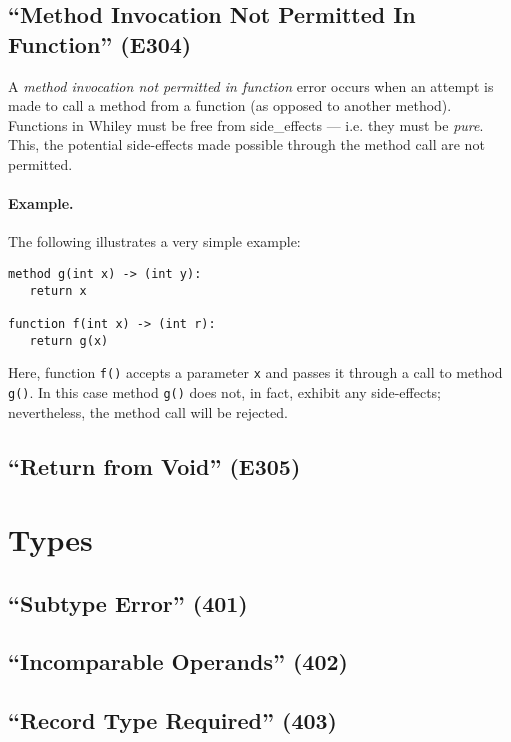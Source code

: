 \subsection{``Method Invocation Not Permitted In Function'' (E304)}

A {\em method invocation not permitted in function} error occurs when an attempt is made to call a method from a function (as opposed to another method).  Functions in Whiley must be free from \glspl{side_effect} --- i.e. they must be {\em pure}.  This, the potential side-effects made possible through the method call are not permitted.

\paragraph{Example.}  The following illustrates a very simple example:

\begin{lstlisting}
method g(int x) -> (int y):
   return x

function f(int x) -> (int r):
   return g(x)
\end{lstlisting}

Here, function \lstinline{f()} accepts a parameter \lstinline{x} and passes it through a call to method \lstinline{g()}.  In this case method \lstinline{g()} does not, in fact, exhibit any side-effects; nevertheless, the method call will be rejected.

\subsection{``Return from Void'' (E305)}
	
\section{Types}
\label{c_err_types}

\subsection{``Subtype Error'' (401)}

\subsection{``Incomparable Operands'' (402)}

\subsection{``Record Type Required'' (403)}

